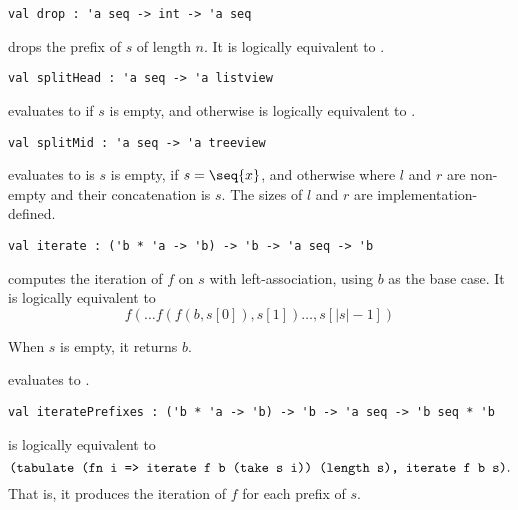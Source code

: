\begin{gram}[drop]
\label{gr:drop}
\begin{verbatim}
val drop : 'a seq -> int -> 'a seq
\end{verbatim}
 drops the prefix of $s$ of length $n$. It is logically equivalent
to .
\end{gram}

\begin{gram}[splitHead]
\label{gr:splitHead}
\begin{verbatim}
val splitHead : 'a seq -> 'a listview
\end{verbatim}
 evaluates to  if $s$ is empty, and otherwise is
logically equivalent to .
\end{gram}

\begin{gram}[splitMid]
\label{gr:splitMid}
\begin{verbatim}
val splitMid : 'a seq -> 'a treeview
\end{verbatim}
 evaluates to  is $s$ is empty,  if
$s = \seq{x}$, and  otherwise where $l$ and $r$ are non-empty and their
concatenation is $s$. The sizes of $l$ and $r$ are implementation-defined.
\end{gram}

\begin{group}
\begin{gram}[iterate]
\label{gr:iterate}
\begin{verbatim}
val iterate : ('b * 'a -> 'b) -> 'b -> 'a seq -> 'b
\end{verbatim}
 computes the iteration of $f$ on $s$ with left-association,
using $b$ as the base case. It is logically equivalent to
\[
  f(\ldots f(f(b, s[0]), s[1]) \ldots, s[|s|-1])
\]
\end{gram}
\begin{note}
When $s$ is empty, it returns $b$.
\end{note}
\begin{example}
 evaluates to .
\end{example}
\end{group}

\begin{gram}[iteratePrefixes]
\label{gr:iteratePrefixes}
\begin{verbatim}
val iteratePrefixes : ('b * 'a -> 'b) -> 'b -> 'a seq -> 'b seq * 'b
\end{verbatim}
 is logically equivalent to
\[
  \texttt{(tabulate (fn i => iterate f b (take s i)) (length s), iterate f b s)}.
\]
That is, it produces the iteration of $f$ for each prefix of $s$.
\end{gram}

